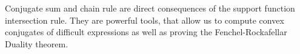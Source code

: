 
\begin{takeaways}
  Conjugate sum and chain rule are direct consequences of the support function intersection rule. They are powerful tools, that allow us to compute convex conjugates of difficult expressions as well as proving the Fenchel-Rockafellar Duality theorem.
\end{takeaways}
